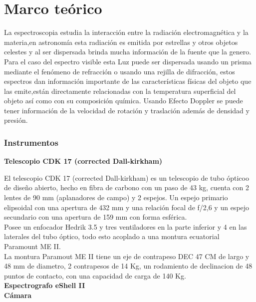 \newpage
\chapter{Marco teórico}


La espectroscopia estudia la interacción entre la radiación electromagnética y la materia,en astronomía esta radiación es emitida por estrellas y otros objetos celestes y al ser dispersada brinda mucha información de la fuente que la genero.\\
Para el caso del espectro visible esta Luz puede ser dispersada usando un prisma mediante el fenómeno de refracción o usando una rejilla de difracción, estos espectros dan información importante de las características físicas del objeto que las emite,están directamente relacionadas con la temperatura superficial del objeto así como con su composición química. Usando Efecto Doppler se puede tener información de la velocidad de rotación y traslación además de densidad y presión. \cite{utilidad}\\


\subsection{Instrumentos}

\noindent \textbf{ Telescopio CDK 17 (corrected Dall-kirkham)}

\noindent El telescopio CDK 17 (corrected Dall-kirkham) es un telescopio de tubo ópticoo de diseño abierto, hecho en fibra de carbono con un paso de 43 kg, cuenta con 2 lentes de 90 mm (aplanadores de campo) y 2 espejos. 
Un espejo primario elipsoidal con una apertura de 432 mm y una relación focal de f/2,6 y un espejo secundario con una apertura de 159 mm con forma esférica.\\
Posee un enfocador Hedrik 3.5 y tres ventiladores en la parte inferior y 4 en las laterales del tubo óptico, todo esto acoplado a una montura ecuatorial Paramount ME II.\\
La montura Paramout ME II tiene un eje de contrapeso DEC 47 CM  de largo y 48 mm de diametro, 2 contrapesos de 14 Kg, un rodamiento de declinacion de 48 puntos de contacto, con una capacidad de carga de 140 Kg.\\

\noindent \textbf{Espectrografo  eShell II }\\

\noindent \textbf{Cámara  }






